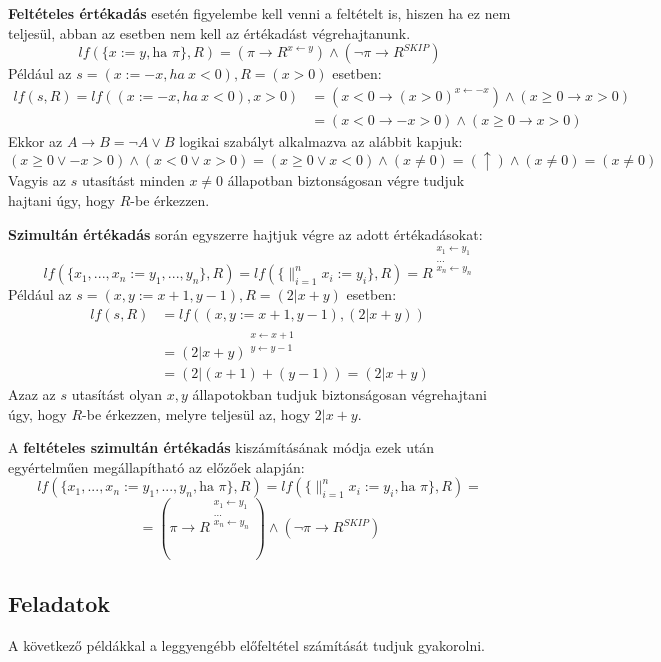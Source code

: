 \documentclass[12pt]{article}
\begin{document}
\textbf{Feltételes értékadás} esetén figyelembe kell venni a feltételt is, hiszen ha ez nem teljesül, abban az esetben nem kell az értékadást végrehajtanunk.
$$lf(\{x:=y, \text{ha } \pi\}, R) = (\pi \rightarrow R^{x \leftarrow y}) \land (\neg \pi \rightarrow R^{SKIP})$$
Például az $s = (x := -x, ha\ x < 0), R = (x > 0)$ esetben:
\begin{align*}
	lf(s, R) = lf((x := -x, ha\ x < 0), x > 0) &= (x < 0 \rightarrow (x > 0)^{x \leftarrow -x}) \land (x \ge 0 \rightarrow x > 0)\\
	&= (x < 0 \rightarrow -x > 0) \land (x \ge 0 \rightarrow x > 0)
\end{align*}
Ekkor az $A \rightarrow B = \neg A \lor B$ logikai szabályt alkalmazva az alábbit kapjuk:
$$ (x \ge 0 \lor -x > 0) \land (x < 0 \lor x > 0) = (x \ge 0 \lor x < 0) \land (x \neq 0) = (\uparrow) \land (x \neq 0) = (x \neq 0)$$
Vagyis az $s$ utasítást minden $x \neq 0$ állapotban biztonságosan végre tudjuk hajtani úgy, hogy $R$-be érkezzen.

\textbf{Szimultán értékadás} során egyszerre hajtjuk végre az adott értékadásokat:
$$lf(\{x_1, ..., x_n := y_1, ..., y_n\}, R) = lf(\{ \mathop{\parallel}_{i=1}^{n} x_i := y_i \}, R) = R^{\substack{ x_1 \leftarrow y_1 \\ ... \\ x_n \leftarrow y_n }}$$
Például az $s = (x,y := x + 1, y - 1), R = (2 | x + y)$ esetben:
\begin{align*}
	lf(s, R) &= lf((x,y := x + 1, y - 1), (2 | x + y)) \\
		&= (2 | x + y)^{\substack{ x \leftarrow x + 1 \\ y \leftarrow y - 1 }} \\
		&= (2 | (x + 1) + (y - 1)) = (2 | x + y)
\end{align*}
Azaz az $s$ utasítást olyan $x, y$ állapotokban tudjuk biztonságosan végrehajtani úgy, hogy $R$-be érkezzen, melyre teljesül az, hogy $2 | x + y$.

A \textbf{feltételes szimultán értékadás} kiszámításának módja ezek után egyértelműen megállapítható az előzőek alapján:
$$lf(\{x_1, ..., x_n := y_1, ..., y_n, \text{ha } \pi \}, R) = lf(\{ \mathop{\parallel}_{i=1}^{n} x_i := y_i, \text{ha }\pi \}, R) = $$
$$= (\pi \rightarrow R^{\substack{ x_1 \leftarrow y_1 \\ ... \\ x_n \leftarrow y_n }}) \land (\neg \pi \rightarrow R^{SKIP})$$

\subsection{Feladatok}\label{lf-feladat}
A következő példákkal a leggyengébb előfeltétel számítását tudjuk gyakorolni.
\end{document}
